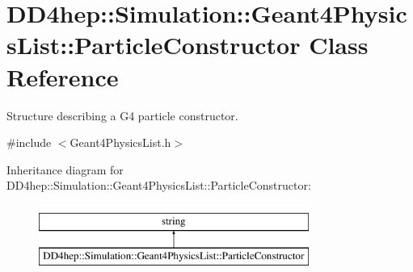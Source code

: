 \hypertarget{class_d_d4hep_1_1_simulation_1_1_geant4_physics_list_1_1_particle_constructor}{}\section{D\+D4hep\+:\+:Simulation\+:\+:Geant4\+Physics\+List\+:\+:Particle\+Constructor Class Reference}
\label{class_d_d4hep_1_1_simulation_1_1_geant4_physics_list_1_1_particle_constructor}


Structure describing a G4 particle constructor.  




{\ttfamily \#include $<$Geant4\+Physics\+List.\+h$>$}

Inheritance diagram for D\+D4hep\+:\+:Simulation\+:\+:Geant4\+Physics\+List\+:\+:Particle\+Constructor\+:\begin{figure}[H]
\begin{center}
\leavevmode
\includegraphics[height=2.000000cm]{class_d_d4hep_1_1_simulation_1_1_geant4_physics_list_1_1_particle_constructor}
\end{center}
\end{figure}
